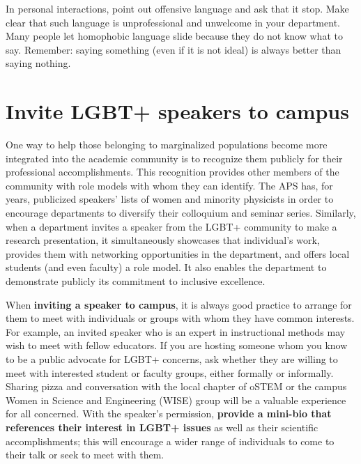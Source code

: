 In personal interactions, point out offensive language and ask that it stop.  Make clear that such language is unprofessional and unwelcome in your department.  Many people let homophobic language slide because they do not know what to say.  Remember: saying something (even if it is not ideal) is always better than saying nothing.


\section {Invite LGBT+ speakers to campus}
\label{lgbt-speakers}
One way to help those belonging to marginalized populations become more integrated into the academic community is to recognize them publicly for their professional accomplishments. This recognition provides other members of the community with role models with whom they can identify. The APS has, for years, publicized speakers' lists of women and minority physicists in order to encourage departments to diversify their colloquium and seminar series.  Similarly, when a department invites a speaker from the LGBT+ community to make a research presentation, it simultaneously showcases that individual's work, provides them with networking opportunities in the department, and offers local students (and even faculty) a role model. It also enables the department to demonstrate publicly its commitment to inclusive excellence.

When \textbf{inviting a speaker to campus}, it is always good practice to arrange for them to meet with individuals or groups with whom they have common interests. For example, an invited speaker who is an expert in instructional methods may wish to meet with fellow educators. If you are hosting someone whom you know to be a public advocate for LGBT+ concerns, ask whether they are willing to meet with interested student or faculty groups, either formally or informally.  Sharing pizza and conversation with the local chapter of oSTEM or the campus Women in Science and Engineering (WISE) group will be a valuable experience for all concerned.  With the speaker's permission, \textbf{provide a mini-bio that references their interest in LGBT+ issues} as well as their scientific accomplishments; this will encourage a wider range of individuals to come to their talk or seek to meet with them.  

